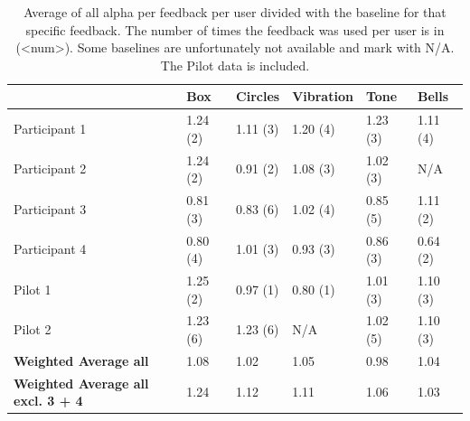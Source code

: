 \documentclass[a4paper,10pt,english,lof,lot,twoside]{puthesis}
\begin{document}
\begin{table}
\capstart
\begin{center}

\begin{tabular}{l l l l l l}

\toprule
\textsf{\relax } & \textsf{\relax 
Box
} & \textsf{\relax 
Circles
} & \textsf{\relax 
Vibration
} & \textsf{\relax 
Tone
} & \textsf{\relax 
Bells
}\\
\hline\midrule

Participant 1
 & 
1.24 (2)
 & 
1.11 (3)
 & 
1.20 (4)
 & 
1.23 (3)
 & 
1.11 (4)
\\

Participant 2
 & 
1.24 (2)
 & 
0.91 (2)
 & 
1.08 (3)
 & 
1.02 (3)
 & 
N/A
\\

Participant 3
 & 
0.81 (3)
 & 
0.83 (6)
 & 
1.02 (4)
 & 
0.85 (5)
 & 
1.11 (2)
\\

Participant 4
 & 
0.80 (4)
 & 
1.01 (3)
 & 
0.93 (3)
 & 
0.86 (3)
 & 
0.64 (2)
\\

Pilot 1
 & 
1.25 (2)
 & 
0.97 (1)
 & 
0.80 (1)
 & 
1.01 (3)
 & 
1.10 (3)
\\

Pilot 2
 & 
1.23 (6)
 & 
1.23 (6)
 & 
N/A
 & 
1.02 (5)
 & 
1.10 (3)
\\

\textbf{Weighted Average
all}
 & 
1.08
 & 
1.02
 & 
1.05
 & 
0.98
 & 
1.04
\\

\textbf{Weighted Average
all excl. 3 + 4}
 & 
1.24
 & 
1.12
 & 
1.11
 & 
1.06
 & 
1.03
\\
\hline\bottomrule

\end{tabular}
\caption[Average of all alpha per feedback per user divided with the baseline for that feedback]{Average of all alpha per feedback per user divided with the baseline for that specific feedback. The number of times the feedback was used per user is in (\textless{}num\textgreater{}). Some baselines are unfortunately not available and mark with N/A. The Pilot data is included.}\label{ch-evaluation/index:table-logged-data-avg-alpha-baseline-per-user}
\end{center}
\end{table}
\end{document}
